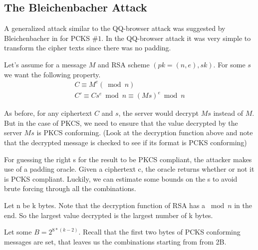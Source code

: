 \subsection*{The Bleichenbacher Attack}
\indent A generalized attack similar to the QQ-browser attack was suggested by Bleichenbacher in \cite{BleichRSA} for PCKS $\# 1$. In the QQ-browser attack it was very simple to transform the cipher texts since there was no padding. \newline

Let's assume for a message $M$ and RSA scheme $(pk = (n,e), sk)$. For some $s$ we want the following property. 
\begin{align*}
 C \equiv M^e ( \bmod n ) \\
 C' \equiv Cs^e \bmod n \equiv (Ms)^e \bmod n 
\end{align*}

\indent As before, for any ciphertext $C$ and $s$, the server would decrypt $Ms$ instead of $M$. But in the case of PKCS, we need to ensure that the value decrypted by the server $Ms$ is PKCS conforming. (Look at the decryption function above and note that the decrypted message is checked to see if its format is PCKS conforming) \newline

\indent For guessing the right s for the result to be PKCS compliant, the attacker makes use of a padding oracle. Given a ciphertext c, the oracle returns whether or not it is PCKS compliant. Luckily, we can estimate some bounds on the s to avoid brute forcing through all the combinations. \newline

Let n be k bytes. Note that the decryption function of RSA has a $\bmod n$ in the end. So the largest 
value decrypted is the largest number of k bytes. 

Let some $ B = 2^{8*(k-2)}$. Recall that the first two bytes of PCKS conforming messages are set, that leaves us the combinations starting from from 2B.

